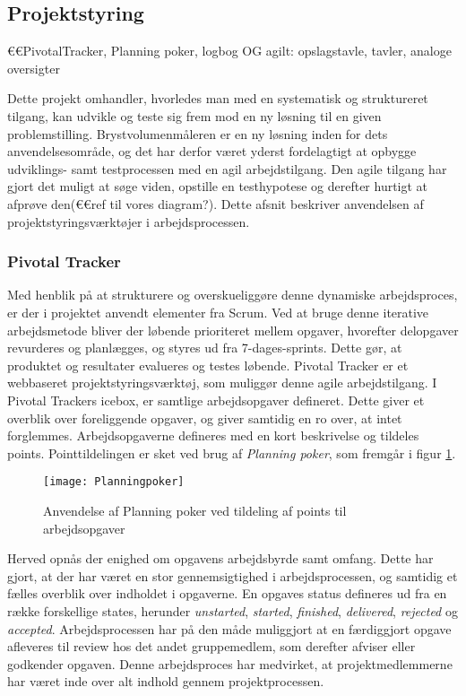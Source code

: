 \subsection{Projektstyring}
	€€PivotalTracker, Planning poker, logbog OG agilt: opslagstavle, tavler, analoge oversigter
	
	Dette projekt omhandler, hvorledes man med en systematisk og struktureret tilgang, kan udvikle og teste sig frem mod en ny løsning til en given problemstilling. Brystvolumenmåleren er en ny løsning inden for dets anvendelsesområde, og det har derfor været yderst fordelagtigt at opbygge udviklings- samt testprocessen med en agil arbejdstilgang. Den agile tilgang har gjort det muligt at søge viden, opstille en testhypotese og derefter hurtigt at afprøve den(€€ref til vores diagram?). Dette afsnit beskriver anvendelsen af projektstyringsværktøjer i arbejdsprocessen. 
	\subsubsection{Pivotal Tracker}
	Med henblik på at strukturere og overskueliggøre denne dynamiske arbejdsproces, er der i projektet anvendt elementer fra Scrum. Ved at bruge denne iterative arbejdsmetode bliver der løbende prioriteret mellem opgaver, hvorefter delopgaver revurderes og planlægges, og styres ud fra 7-dages-sprints. Dette gør, at produktet og resultater evalueres og testes løbende. Pivotal Tracker er et webbaseret projektstyringsværktøj, som muliggør denne agile arbejdstilgang. I Pivotal Trackers icebox, er samtlige arbejdsopgaver defineret. Dette giver et overblik over foreliggende opgaver, og giver samtidig en ro over, at intet forglemmes. Arbejdsopgaverne defineres med en kort beskrivelse og tildeles points. Pointtildelingen er sket ved brug af \textit{Planning poker}, som fremgår i figur \ref{fig:planningpoker}. 
	
	\begin{figure}[htb]
	\centering
	\texttt{[image: Planningpoker]}
	\caption{Anvendelse af Planning poker ved tildeling af points til arbejdsopgaver}
	\label{fig:planningpoker}	
	\end{figure}
	
	Herved opnås der enighed om opgavens arbejdsbyrde samt omfang. Dette har gjort, at der har været en stor gennemsigtighed i arbejdsprocessen, og samtidig et fælles overblik over indholdet i opgaverne. En opgaves status defineres ud fra en række forskellige states, herunder \textit{unstarted}, \textit{started}, \textit{finished}, \textit{delivered}, \textit{rejected} og \textit{accepted}. Arbejdsprocessen har på den måde muliggjort at en færdiggjort opgave afleveres til review hos det andet gruppemedlem, som derefter afviser eller godkender opgaven. Denne arbejdsproces har medvirket, at projektmedlemmerne har været inde over alt indhold gennem projektprocessen.  
    
